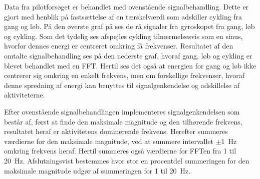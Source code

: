 Data fra pilotforsøget er behandlet med ovenstående signalbehandling. Dette er gjort med henblik på fastsættelse af en tærskelværdi som adskiller cykling fra gang og løb. På den øverste graf på  ses de rå signaler fra gyroskopet fra gang, løb og cykling. Som det tydelig ses afspejles cykling tilnærmelsesvis som en sinus, hvorfor dennes energi er centreret omkring få frekvenser. Resultatet af den omtalte signalbehandling ses på den nederste graf, hvoraf gang, løb og cykling er blevet behandlet med en FFT. Hertil ses det også at energien for gang og løb ikke centrerer sig omkring en enkelt frekvens, men om forskellige frekvenser, hvoraf denne spredning af energi kan benyttes til signalgenkendelse og adskillelse af aktiviteterne. 

Efter ovenstående signalbehandlingen implementeres signalgenkendelsen som består af, først at finde den maksimale magnitude og den tilhørende frekvens, resultatet heraf er aktivitetens dominerende frekvens. Herefter summeres værdierne for den maksimale magnitude, ved at summere intervallet $\pm$1~Hz omkring frekvens heraf. Hertil summeres også værdierne for FFTen fra 1 til 20~Hz. Afslutningsvist bestemmes hvor stor en procentdel summeringen for den maksimale magnitude udgør af summeringen for 1 til 20~Hz.\\ 

